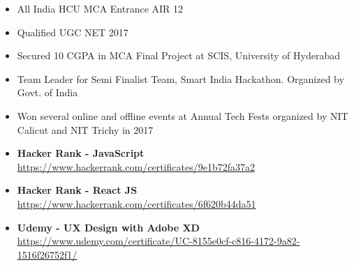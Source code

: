
{}
\divider

\smallskip
\begin{itemize}
\item All India HCU MCA Entrance AIR 12
\smallskip
\item Qualified UGC NET 2017
\smallskip
\item Secured 10 CGPA in MCA Final Project at SCIS, University of Hyderabad
\smallskip
\item Team Leader for Semi Finalist Team, Smart India Hackathon. Organized by Govt. of India
\smallskip
\item Won several online and offline events at Annual Tech Fests organized by NIT Calicut and NIT Trichy in 2017
\end{itemize}


\smallskip
\begin{itemize}
\item \textbf{Hacker Rank - JavaScript}
\newline
\url{https://www.hackerrank.com/certificates/9e1b72fa37a2}
\smallskip
\item \textbf{Hacker Rank - React JS}
\newline
\url{https://www.hackerrank.com/certificates/6f620b44da51}
\smallskip
\item \textbf{Udemy - UX Design with Adobe XD}
\newline
\url{https://www.udemy.com/certificate/UC-8155e0cf-c816-4172-9a82-1516f26752f1/}
\smallskip
\end{itemize}






